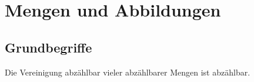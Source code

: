 \documentclass[../main.tex]{subfiles}
\begin{document}
\chapter{Mengen und Abbildungen}
\section{Grundbegriffe}
\begin{theorem}
  Die Vereinigung abzählbar vieler abzählbarer Mengen
  ist abzählbar.
\end{theorem}
\end{document}
